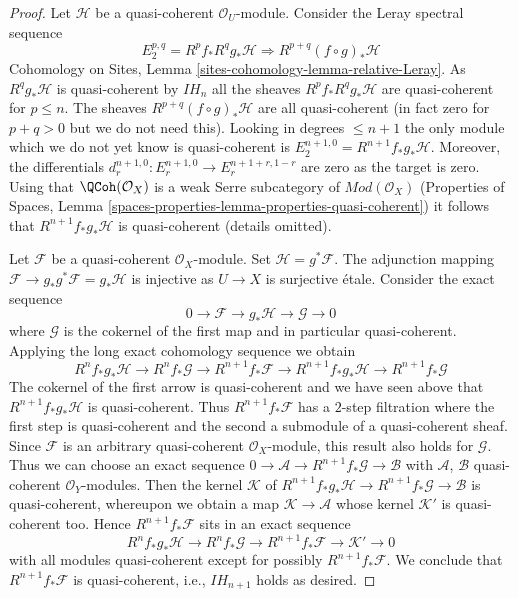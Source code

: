 \begin{proof}
\medskip\noindent
Let $\mathcal{H}$ be a quasi-coherent $\mathcal{O}_U$-module.
Consider the Leray spectral sequence
$$
E_2^{p, q} = R^pf_* R^qg_* \mathcal{H}
\Rightarrow
R^{p + q}(f \circ g)_*\mathcal{H}
$$
Cohomology on Sites, Lemma \ref{sites-cohomology-lemma-relative-Leray}.
As $R^qg_*\mathcal{H}$ is quasi-coherent by $IH_n$ all the sheaves
$R^pf_*R^qg_*\mathcal{H}$ are quasi-coherent for $p \leq n$.
The sheaves $R^{p + q}(f \circ g)_*\mathcal{H}$ are all
quasi-coherent (in fact zero for $p + q > 0$ but we do not need this).
Looking in degrees $\leq n + 1$ the only module which we do not
yet know is quasi-coherent is $E_2^{n + 1, 0} = R^{n + 1}f_*g_*\mathcal{H}$.
Moreover, the differentials
$d_r^{n + 1, 0} : E_r^{n + 1, 0} \to E_r^{n + 1 + r, 1 - r}$
are zero as the target is zero. Using that $\QCoh(\mathcal{O}_X)$
is a weak Serre subcategory of $\textit{Mod}(\mathcal{O}_X)$
(Properties of Spaces, Lemma
\ref{spaces-properties-lemma-properties-quasi-coherent}) it
follows that $R^{n + 1}f_*g_*\mathcal{H}$
is quasi-coherent (details omitted).

\medskip\noindent
Let $\mathcal{F}$ be a quasi-coherent $\mathcal{O}_X$-module.
Set $\mathcal{H} = g^*\mathcal{F}$. The adjunction mapping
$\mathcal{F} \to g_*g^*\mathcal{F} = g_*\mathcal{H}$ is injective
as $U \to X$ is surjective \'etale. Consider the exact sequence
$$
0 \to \mathcal{F} \to g_*\mathcal{H} \to \mathcal{G} \to 0
$$
where $\mathcal{G}$ is the cokernel of the first map and in particular
quasi-coherent. Applying the long exact cohomology sequence we obtain
$$
R^nf_*g_*\mathcal{H} \to
R^nf_*\mathcal{G} \to
R^{n + 1}f_*\mathcal{F} \to
R^{n + 1}f_*g_*\mathcal{H} \to
R^{n + 1}f_*\mathcal{G}
$$
The cokernel of the first arrow is quasi-coherent and
we have seen above that $R^{n + 1}f_*g_*\mathcal{H}$ is quasi-coherent.
Thus $R^{n + 1}f_*\mathcal{F}$ has a $2$-step filtration
where the first step is quasi-coherent and the second a submodule of
a quasi-coherent sheaf. Since $\mathcal{F}$ is an arbitrary quasi-coherent
$\mathcal{O}_X$-module, this result also holds for $\mathcal{G}$.
Thus we can choose an exact sequence
$0 \to \mathcal{A} \to R^{n + 1}f_*\mathcal{G} \to \mathcal{B}$
with $\mathcal{A}$, $\mathcal{B}$ quasi-coherent $\mathcal{O}_Y$-modules.
Then the kernel $\mathcal{K}$ of
$R^{n + 1}f_*g_*\mathcal{H} \to R^{n + 1}f_*\mathcal{G}
\to \mathcal{B}$ is quasi-coherent, whereupon we obtain a map
$\mathcal{K} \to \mathcal{A}$ whose kernel $\mathcal{K}'$ is
quasi-coherent too. Hence $R^{n + 1}f_*\mathcal{F}$ sits in an exact
sequence
$$
R^nf_*g_*\mathcal{H} \to
R^nf_*\mathcal{G} \to
R^{n + 1}f_*\mathcal{F} \to \mathcal{K}' \to 0
$$
with all modules quasi-coherent except for possibly $R^{n + 1}f_*\mathcal{F}$.
We conclude that $R^{n + 1}f_*\mathcal{F}$ is quasi-coherent, i.e.,
$IH_{n + 1}$ holds as desired.
\end{proof}

